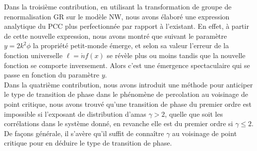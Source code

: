 Dans la troisième contribution, en utilisant la transformation de groupe de renormalisation GR sur le modèle NW, nous avons élaboré une expression analytique du PCC plus perfectionnée par rapport à l'existant. En effet, à partir de cette nouvelle expression, nous avons montré  que suivant le paramètre $y=2k^2\phi$ la propriété petit-monde émerge, et selon sa valeur l'erreur de la fonction universelle $\ell=\acute{n}f(x)$ se révèle plus ou moins tandis que la nouvelle fonction se comporte inversement. Alors c'est une émergence spectaculaire qui se passe en fonction du paramètre $y$.\\

Dans la quatrième contribution, nous avons introduit une méthode pour anticiper  le type de transition de phase dans le phénomène de percolation au voisinage de point critique, nous avons trouvé qu'une transition de phase du premier ordre est impossible si l'exposant de distribution d'amas $\gamma>2$, quelle que soit les corrélations dans le système donné, en revanche elle est du premier ordre si $\gamma\leq2$. De façons générale, il s'avère qu'il suffit de connaître $\gamma$ au voisinage de point critique pour en déduire le type de transition de phase.\\  
